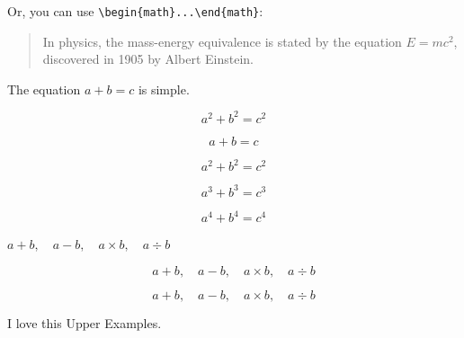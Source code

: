\documentclass[12pt, letterpaper]{article}
\begin{document}
\noindent Or, you can use \verb|\begin{math}...\end{math}|:

\begin{quote}
In physics, the mass-energy equivalence is stated 
by the equation \begin{math}E=mc^2\end{math}, discovered in 1905 by Albert Einstein.
\end{quote}








\newpage

The equation $a + b = c$ is simple.

\[ a^2 + b^2 = c^2\]


\begin{equation}
	a + b = c
\end{equation}

\begin{equation}
a^2 + b^2 = c^2
\end{equation}

\begin{equation}
	a^3 + b^3 = c^3
\end{equation}

\begin{equation}
a^4 + b^4 = c^4
\end{equation}

$
a + b,\quad a - b,\quad a \times b,\quad a \div b
$


\[
a + b,\quad a - b,\quad a \times b,\quad a \div b
\]


\[
a + b,\quad 
a - b,\quad 
a \times b,\quad 
a \div b
\]





\vspace{10\baselineskip}

I love this Upper Examples.



\newpage





\mbox{}


\newpage
\end{document}
